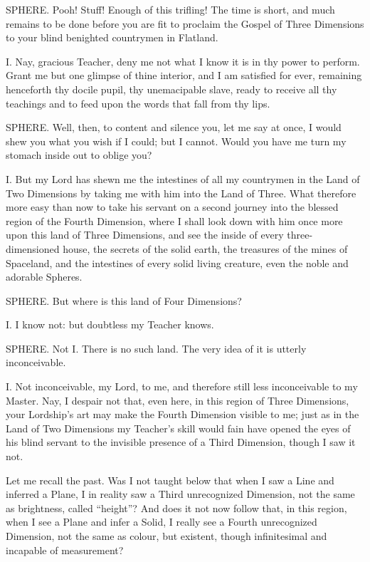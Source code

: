 \documentclass[12pt, a4paper, oneside]{memoir}
\begin{document}
SPHERE. Pooh! Stuff! Enough of this trifling! The time is short, and much
remains to be done before you are fit to proclaim the Gospel of Three
Dimensions to your blind benighted countrymen in Flatland.

I. Nay, gracious Teacher, deny me not what I know it is in thy power to
perform. Grant me but one glimpse of thine interior, and I am satisfied for
ever, remaining henceforth thy docile pupil, thy unemacipable slave, ready to
receive all thy teachings and to feed upon the words that fall from thy lips.

SPHERE. Well, then, to content and silence you, let me say at once, I would
shew you what you wish if I could; but I cannot. Would you have me turn my
stomach inside out to oblige you?

I. But my Lord has shewn me the intestines of all my countrymen in the Land of
Two Dimensions by taking me with him into the Land of Three. What therefore
more easy than now to take his servant on a second journey into the blessed
region of the Fourth Dimension, where I shall look down with him once more
upon this land of Three Dimensions, and see the inside of every
three-dimensioned house, the secrets of the solid earth, the treasures of the
mines of Spaceland, and the intestines of every solid living creature, even
the noble and adorable Spheres.

SPHERE. But where is this land of Four Dimensions?

I. I know not: but doubtless my Teacher knows.

SPHERE. Not I. There is no such land. The very idea of it is utterly
inconceivable.

I. Not inconceivable, my Lord, to me, and therefore still less inconceivable
to my Master. Nay, I despair not that, even here, in this region of Three
Dimensions, your Lordship's art may make the Fourth Dimension visible to me;
just as in the Land of Two Dimensions my Teacher's skill would fain have
opened the eyes of his blind servant to the invisible presence of a Third
Dimension, though I saw it not.

Let me recall the past. Was I not taught below that when I saw a Line and
inferred a Plane, I in reality saw a Third unrecognized Dimension, not the
same as brightness, called ``height''? And does it not now follow that, in this
region, when I see a Plane and infer a Solid, I really see a Fourth
unrecognized Dimension, not the same as colour, but existent, though
infinitesimal and incapable of measurement?
\end{document}
